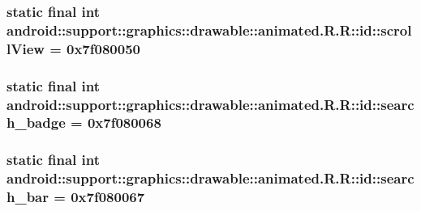 \hypertarget{classandroid_1_1support_1_1graphics_1_1drawable_1_1animated_1_1_r_1_1id_3a0926b43068dcb6b2867953e0b8a053}{
\subsubsection[{scrollView}]{\setlength{\rightskip}{0pt plus 5cm}static final int android::support::graphics::drawable::animated.R.R::id::scrollView = 0x7f080050}}
\label{classandroid_1_1support_1_1graphics_1_1drawable_1_1animated_1_1_r_1_1id_3a0926b43068dcb6b2867953e0b8a053}


\hypertarget{classandroid_1_1support_1_1graphics_1_1drawable_1_1animated_1_1_r_1_1id_76366c29d1c0d3ab87c6ba89d4c602a0}{
\subsubsection[{search\_\-badge}]{\setlength{\rightskip}{0pt plus 5cm}static final int android::support::graphics::drawable::animated.R.R::id::search\_\-badge = 0x7f080068}}
\label{classandroid_1_1support_1_1graphics_1_1drawable_1_1animated_1_1_r_1_1id_76366c29d1c0d3ab87c6ba89d4c602a0}


\hypertarget{classandroid_1_1support_1_1graphics_1_1drawable_1_1animated_1_1_r_1_1id_944fb95e568c7a6007f4a3abdc4f3775}{
\subsubsection[{search\_\-bar}]{\setlength{\rightskip}{0pt plus 5cm}static final int android::support::graphics::drawable::animated.R.R::id::search\_\-bar = 0x7f080067}}
\label{classandroid_1_1support_1_1graphics_1_1drawable_1_1animated_1_1_r_1_1id_944fb95e568c7a6007f4a3abdc4f3775}


